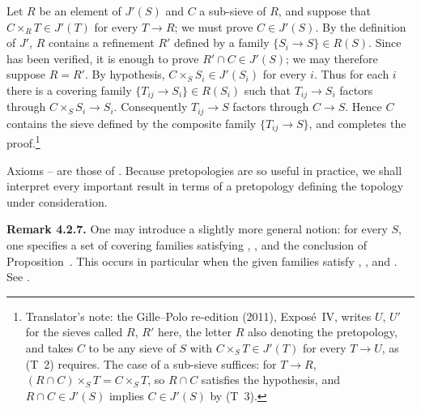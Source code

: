 Let \(R\) be an element of \(J'(S)\) and \(C\) a sub-sieve of \(R\), and
suppose that \(C\times_RT\in J'(T)\) for every \(T\to R\); we must prove
\(C\in J'(S)\). By the definition of \(J'\), \(R\) contains a refinement
\(R'\) defined by a family \(\{S_i\to S\}\in R(S)\). Since  has been
verified, it is enough to prove \(R'\cap C\in J'(S)\); we may therefore
suppose \(R=R'\). By hypothesis,
\(C\times_SS_i\in J'(S_i)\) for every \(i\). Thus for each \(i\) there is
a covering family \(\{T_{ij}\to S_i\}\in R(S_i)\) such that
\(T_{ij}\to S_i\) factors through \(C\times_SS_i\to S_i\). Consequently
\(T_{ij}\to S\) factors through \(C\to S\). Hence \(C\) contains the sieve
defined by the composite family \(\{T_{ij}\to S\}\), and  completes
the proof.\footnote{Translator's note: the Gille--Polo re-edition (2011), Expos\'e~IV, writes
\(U\), \(U'\) for the sieves called \(R\), \(R'\) here, the letter \(R\) also
denoting the pretopology, and takes \(C\) to be any sieve of \(S\) with
\(C\times_ST\in J'(T)\) for every \(T\to U\), as (T~2) requires. The case of a
sub-sieve suffices: for \(T\to R\), \((R\cap C)\times_ST=C\times_ST\), so
\(R\cap C\) satisfies the hypothesis, and \(R\cap C\in J'(S)\) implies
\(C\in J'(S)\) by (T~3).}

Axioms -- are those of . Because pretopologies are so useful
in practice, we shall interpret every important result in terms of a
pretopology defining the topology under consideration.

\medskip
\noindent{}\textbf{Remark 4.2.7.}
One may introduce a slightly more general notion: for every \(S\), one
specifies a set of covering families satisfying , , and the
conclusion of Proposition~. This occurs in particular when the given
families satisfy , , and . See .

